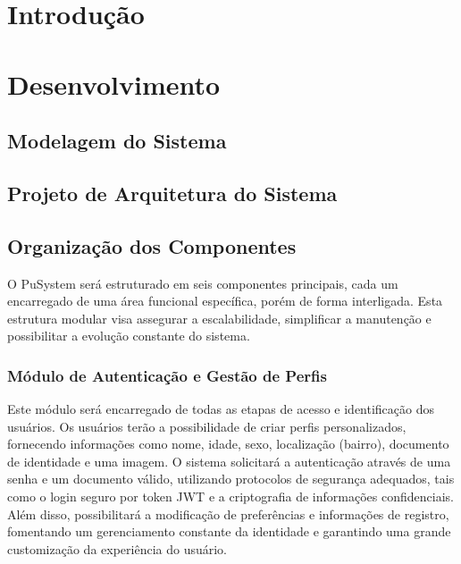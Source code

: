 \documentclass[a5paper, 12pt]{article}
\begin{document}


\newpage
\section{Introdução}
\newpage
\section{Desenvolvimento}

\subsection{Modelagem do Sistema}

\subsection{Projeto de Arquitetura do Sistema}

\subsection{Organização dos Componentes}

O PuSystem será estruturado em seis componentes principais, cada um encarregado de uma área funcional específica, porém de forma interligada.  Esta estrutura modular visa assegurar a escalabilidade, simplificar a manutenção e possibilitar a evolução constante do sistema.

\subsubsection{Módulo de Autenticação e Gestão de Perfis}

Este módulo será encarregado de todas as etapas de acesso e identificação dos usuários.  Os usuários terão a possibilidade de criar perfis personalizados, fornecendo informações como nome, idade, sexo, localização (bairro), documento de identidade e uma imagem.  O sistema solicitará a autenticação através de uma senha e um documento válido, utilizando protocolos de segurança adequados, tais como o login seguro por token JWT e a criptografia de informações confidenciais.  Além disso, possibilitará a modificação de preferências e informações de registro, fomentando um gerenciamento constante da identidade e garantindo uma grande customização da experiência do usuário.
\end{document}
